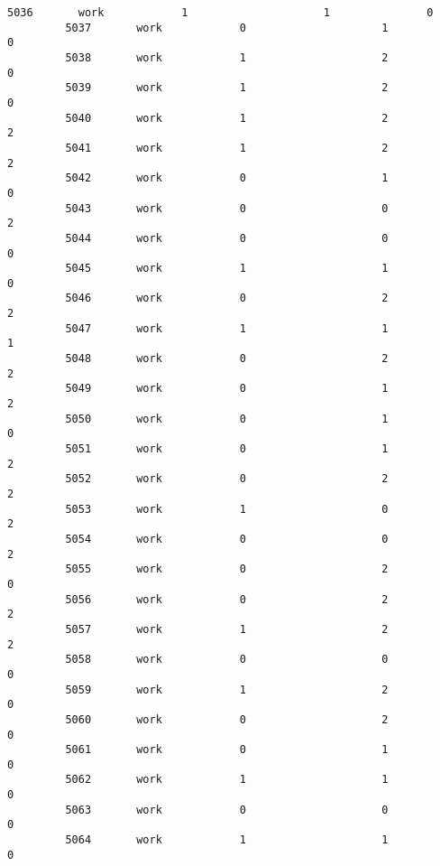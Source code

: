 \documentclass[11pt]{article}
\begin{document}
\begin{Verbatim}[commandchars=\\\{\}]
         5036       work            1                     1               0   
         5037       work            0                     1               0   
         5038       work            1                     2               0   
         5039       work            1                     2               0   
         5040       work            1                     2               2   
         5041       work            1                     2               2   
         5042       work            0                     1               0   
         5043       work            0                     0               2   
         5044       work            0                     0               0   
         5045       work            1                     1               0   
         5046       work            0                     2               2   
         5047       work            1                     1               1   
         5048       work            0                     2               2   
         5049       work            0                     1               2   
         5050       work            0                     1               0   
         5051       work            0                     1               2   
         5052       work            0                     2               2   
         5053       work            1                     0               2   
         5054       work            0                     0               2   
         5055       work            0                     2               0   
         5056       work            0                     2               2   
         5057       work            1                     2               2   
         5058       work            0                     0               0   
         5059       work            1                     2               0   
         5060       work            0                     2               0   
         5061       work            0                     1               0   
         5062       work            1                     1               0   
         5063       work            0                     0               0   
         5064       work            1                     1               0   
         

\end{Verbatim}
\end{document}
